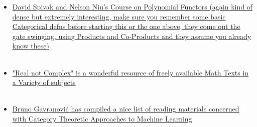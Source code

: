 \begin{itemize}
    \item \href{https://youtube.com/playlist?list=PLhgq-BqyZ7i6IjU82EDzCqgERKjjIPlmh}{David Spivak and Nelson Niu's Course on Polynomial Functors (again kind of dense but extremely interesting, make sure you remember some basic Categorical defns before starting this or the one above, they come out the gate swinging, using Products and Co-Products and they assume you already know these)} \\ \\
    \item \href{https://realnotcomplex.com}{"Real not Complex" is a wonderful resource of freely available Math Texts in a Variety of subjects}\\ \\
    \item \href{https://github.com/bgavran/Category_Theory_Machine_Learning}{Bruno Gavranovi\'{c} has compiled a nice list of reading materials concerned with Category Theoretic Approaches to Machine Learning}\\ 
\end{itemize}
